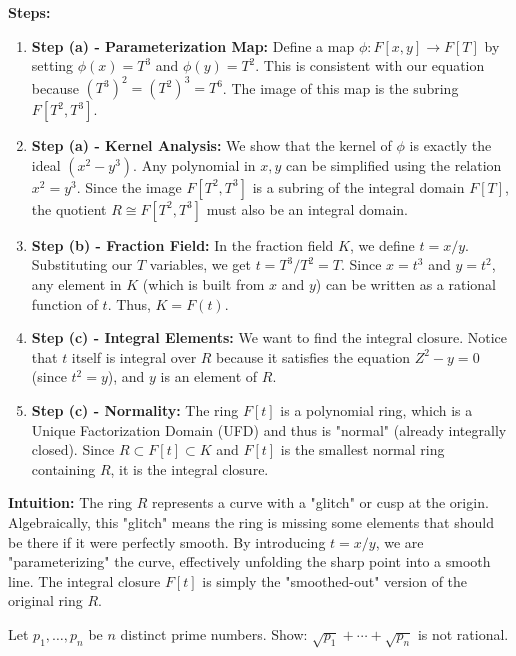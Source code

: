 \begin{solution}
\textbf{Steps:}
\begin{enumerate}
    \item \textbf{Step (a) - Parameterization Map:} Define a map $\phi: F[x, y] \to F[T]$ by setting $\phi(x) = T^3$ and $\phi(y) = T^2$. This is consistent with our equation because $(T^3)^2 = (T^2)^3 = T^6$. The image of this map is the subring $F[T^2, T^3]$.
    \item \textbf{Step (a) - Kernel Analysis:} We show that the kernel of $\phi$ is exactly the ideal $(x^2 - y^3)$. Any polynomial in $x,y$ can be simplified using the relation $x^2 = y^3$. Since the image $F[T^2, T^3]$ is a subring of the integral domain $F[T]$, the quotient $R \cong F[T^2, T^3]$ must also be an integral domain.
    \item \textbf{Step (b) - Fraction Field:} In the fraction field $K$, we define $t = x/y$. Substituting our $T$ variables, we get $t = T^3/T^2 = T$. Since $x = t^3$ and $y = t^2$, any element in $K$ (which is built from $x$ and $y$) can be written as a rational function of $t$. Thus, $K = F(t)$.
    \item \textbf{Step (c) - Integral Elements:} We want to find the integral closure. Notice that $t$ itself is integral over $R$ because it satisfies the equation $Z^2 - y = 0$ (since $t^2 = y$), and $y$ is an element of $R$.
    \item \textbf{Step (c) - Normality:} The ring $F[t]$ is a polynomial ring, which is a Unique Factorization Domain (UFD) and thus is "normal" (already integrally closed). Since $R \subset F[t] \subset K$ and $F[t]$ is the smallest normal ring containing $R$, it is the integral closure.
\end{enumerate}

\textbf{Intuition:}
The ring $R$ represents a curve with a "glitch" or cusp at the origin. Algebraically, this "glitch" means the ring is missing some elements that should be there if it were perfectly smooth. By introducing $t = x/y$, we are "parameterizing" the curve, effectively unfolding the sharp point into a smooth line. The integral closure $F[t]$ is simply the "smoothed-out" version of the original ring $R$.
\end{solution}

\begin{exercise}
\label{algebra:2021:4}
Let $p_1, \ldots, p_n$ be $n$ distinct prime numbers. Show: $\sqrt{p_1} + \cdots + \sqrt{p_n}$ is not rational.
\end{exercise}

